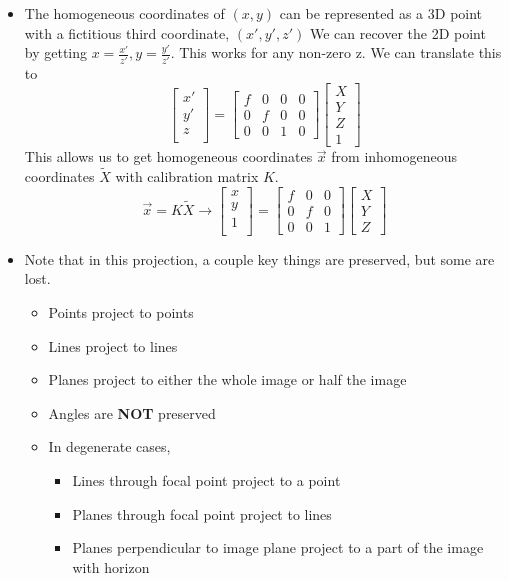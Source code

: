 \documentclass{article}
\begin{document}
\begin{itemize}
    \item The homogeneous coordinates of $(x,y)$ can be represented as a 3D point with a fictitious third coordinate, $(x',y',z')$ We can recover the 2D point by getting $x = \frac{x'}{z'}, y = \frac{y'}{z'}$. This works for any non-zero z. We can translate this to 
    $$\begin{bmatrix}
    x'\\y'\\z\\
    \end{bmatrix} = \begin{bmatrix}
    f&0&0&0\\0&f&0&0\\0&0&1&0
    \end{bmatrix}\begin{bmatrix}
    X\\Y\\Z\\1
    \end{bmatrix}$$
    This allows us to get homogeneous coordinates $\vec{x}$ from inhomogeneous coordinates $\tilde{X}$ with calibration matrix $K$.
    $$\vec{x} = K\tilde{X} \rightarrow \begin{bmatrix}
    x\\y\\1\\
    \end{bmatrix} = \begin{bmatrix}
    f&0&0\\0&f&0\\0&0&1
    \end{bmatrix}\begin{bmatrix}
    X\\Y\\Z
    \end{bmatrix}$$
    \item Note that in this projection, a couple key things are preserved, but some are lost.
    \begin{itemize}
        \item Points project to points
        \item Lines project to lines
        \item Planes project to either the whole image or half the image
        \item Angles are \textbf{NOT} preserved
        \item In degenerate cases, 
        \begin{itemize}
            \item Lines through focal point project to a point
            \item Planes through focal point project to lines
            \item Planes perpendicular to image plane project to a part of the image with horizon
        \end{itemize}
    \end{itemize}
\end{itemize}
\end{document}
